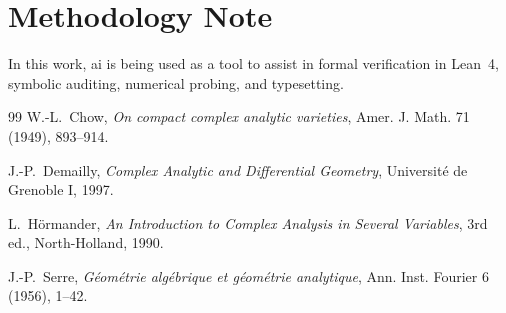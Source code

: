 \documentclass[11pt,a4paper]{article}
\theoremstyle{definition}
\begin{document}
\section*{Methodology Note}
In this work, ai is being used as a tool to assist in formal verification in Lean~4, symbolic auditing, numerical probing, and typesetting.

\begin{thebibliography}{99}
W.-L.~Chow,
\emph{On compact complex analytic varieties},
Amer. J. Math. 71 (1949), 893--914.

J.-P.~Demailly,
\emph{Complex Analytic and Differential Geometry},
Universit\'e de Grenoble I, 1997.

L.~H\"ormander,
\emph{An Introduction to Complex Analysis in Several Variables},
3rd ed., North-Holland, 1990.

J.-P.~Serre,
\emph{G\'eom\'etrie alg\'ebrique et g\'eom\'etrie analytique},
Ann. Inst. Fourier 6 (1956), 1--42.
\end{thebibliography}
\end{document}
